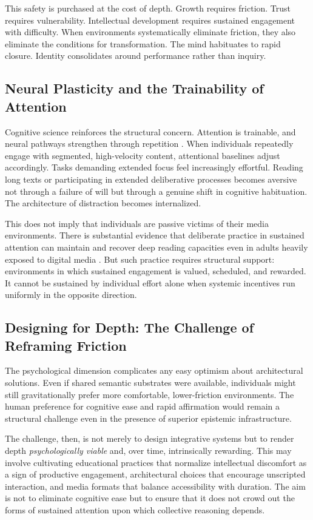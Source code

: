 \documentclass[12pt]{article}
\begin{document}
This safety is purchased at the cost of depth. Growth requires friction. Trust requires vulnerability. Intellectual development requires sustained engagement with difficulty. When environments systematically eliminate friction, they also eliminate the conditions for transformation. The mind habituates to rapid closure. Identity consolidates around performance rather than inquiry.

\subsection{Neural Plasticity and the Trainability of Attention}

Cognitive science reinforces the structural concern. Attention is trainable, and neural pathways strengthen through repetition \citep{Carr2010, Wolf2018}. When individuals repeatedly engage with segmented, high-velocity content, attentional baselines adjust accordingly. Tasks demanding extended focus feel increasingly effortful. Reading long texts or participating in extended deliberative processes becomes aversive not through a failure of will but through a genuine shift in cognitive habituation. The architecture of distraction becomes internalized.

This does not imply that individuals are passive victims of their media environments. There is substantial evidence that deliberate practice in sustained attention can maintain and recover deep reading capacities even in adults heavily exposed to digital media \citep{Wolf2018}. But such practice requires structural support: environments in which sustained engagement is valued, scheduled, and rewarded. It cannot be sustained by individual effort alone when systemic incentives run uniformly in the opposite direction.

\subsection{Designing for Depth: The Challenge of Reframing Friction}

The psychological dimension complicates any easy optimism about architectural solutions. Even if shared semantic substrates were available, individuals might still gravitationally prefer more comfortable, lower-friction environments. The human preference for cognitive ease and rapid affirmation would remain a structural challenge even in the presence of superior epistemic infrastructure.

The challenge, then, is not merely to design integrative systems but to render depth \emph{psychologically viable} and, over time, intrinsically rewarding. This may involve cultivating educational practices that normalize intellectual discomfort as a sign of productive engagement, architectural choices that encourage unscripted interaction, and media formats that balance accessibility with duration. The aim is not to eliminate cognitive ease but to ensure that it does not crowd out the forms of sustained attention upon which collective reasoning depends.
\end{document}
